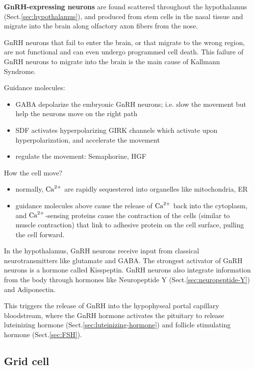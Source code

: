 {\bf GnRH-expressing neurons} are found scattered throughout the hypothalamus
(Sect.\ref{sec:hypothalamus}), and produced from stem cells in the nasal tissue
and migrate into the brain along olfactory axon fibers from the nose.

GnRH neurons that fail to enter the brain, or that migrate to the wrong region,
are not functional and can even undergo programmed cell death.
This failure of GnRH neurons to migrate into the brain is the main cause of
Kallmann Syndrome.


Guidance molecules:
\begin{itemize}
  \item GABA depolarize the embryonic GnRH neurons; i.e. slow the movement but
  help the neurons move on the right path
  
  \item SDF activates hyperpolarizing GIRK channels which activate upon
  hyperpolarization, and accelerate the movement
  
  \item regulate the movement: Semaphorine, HGF
\end{itemize}

How the cell move?
\begin{itemize}
  \item normally, ${\text{Ca}^{2+}}$ are rapidly sequestered into organelles like
  mitochondria, ER
  
  \item guidance molecules above cause the release of ${\text{Ca}^{2+}}$ back into the
  cytoplasm, and ${\text{Ca}^{2+}}$-sensing proteins cause the contraction of the cells
  (similar to muscle contraction) that link to adhesive protein on the cell
  surface, pulling the cell forward.
\end{itemize}

In the hypothalamus, GnRH neurons receive input from classical neurotransmitters
like glutamate and GABA. The strongest activator of GnRH neurons is a hormone
called Kisspeptin.  GnRH neurons also integrate information from the body
through hormones like Neuropeptide Y (Sect.\ref{sec:neuropeptide-Y}) and
Adiponectin.

This triggers the release of GnRH into the hypophyseal
portal capillary bloodstream, where the GnRH hormone activates the pituitary to
release luteinizing hormone (Sect.\ref{sec:luteinizing-hormone}) and follicle
stimulating hormone (Sect.\ref{sec:FSH}).



\subsection{Grid cell}
\label{sec:grid-cell}

